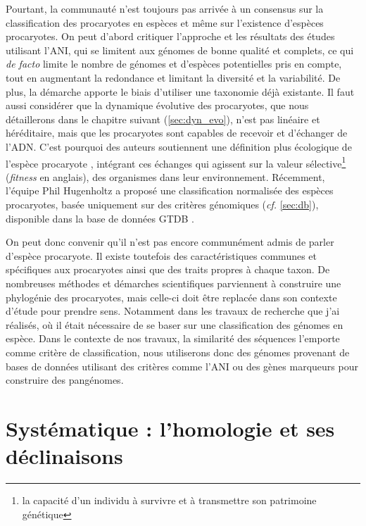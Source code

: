 Pourtant, la communauté n'est toujours pas arrivée à un consensus sur la classification des procaryotes en espèces et même sur l'existence d'espèces procaryotes. On peut d'abord critiquer l'approche et les résultats des études utilisant l'ANI, qui se limitent aux génomes de bonne qualité et complets, ce qui \textit{de facto} limite le nombre de génomes et d'espèces potentielles pris en compte, tout en augmentant la redondance et limitant la diversité et la variabilité. De plus, la démarche apporte le biais d'utiliser une taxonomie déjà existante. Il faut aussi considérer que la dynamique évolutive des procaryotes, que nous détaillerons dans le chapitre suivant (\autoref{sec:dyn_evo}), n'est pas linéaire et héréditaire, mais que les procaryotes sont capables de recevoir et d'échanger de l'ADN. C'est pourquoi des auteurs soutiennent une définition plus écologique de l'espèce procaryote \cite{luo_genome_2011}, intégrant ces échanges qui agissent sur la valeur sélective\footnote{la capacité d'un individu à survivre et à transmettre son patrimoine génétique} (\textit{fitness} en anglais), des organismes dans leur environnement. Récemment, l'équipe Phil Hugenholtz a proposé une classification normalisée des espèces procaryotes, basée uniquement sur des critères génomiques (\textit{cf.} \autoref{sec:db}), disponible dans la base de données GTDB \cite{parks_standardized_2018} .

On peut donc convenir qu'il n'est pas encore communément admis de parler d'espèce procaryote. Il existe toutefois des caractéristiques communes et spécifiques aux procaryotes ainsi que des traits propres à chaque taxon. De nombreuses méthodes et démarches scientifiques parviennent à construire une phylogénie des procaryotes, mais celle-ci doit être replacée dans son contexte d'étude pour prendre sens. Notamment dans les travaux de recherche que j'ai réalisés, où il était nécessaire de se baser sur une classification des génomes en espèce. Dans le contexte de nos travaux, la similarité des séquences l'emporte comme critère de classification, nous utiliserons donc des génomes provenant de bases de données utilisant des critères comme l'ANI ou des gènes marqueurs pour construire des pangénomes.

\section{Systématique : l'homologie et ses déclinaisons}

